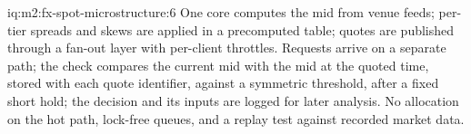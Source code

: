 \begin{solution}{iq:m2:fx-spot-microstructure:6}
One core computes the mid from venue feeds; per-tier spreads and skews are
applied in a precomputed table; quotes are published through a fan-out layer
with per-client throttles. Requests arrive on a separate path; the check
compares the current mid with the mid at the quoted time, stored with each quote
identifier, against a symmetric threshold, after a fixed short hold; the decision
and its inputs are logged for later analysis. No allocation on the hot path,
lock-free queues, and a replay test against recorded market data.
\end{solution}

